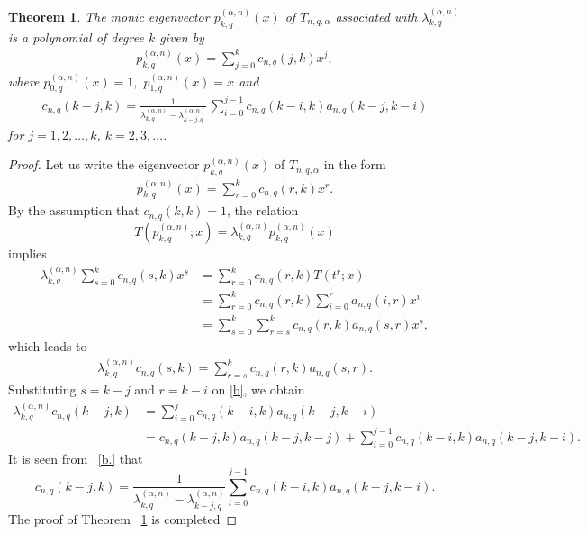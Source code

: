 \documentclass[12pt]{article}
\numberwithin{equation}{section} \theoremstyle{plain}
\newtheorem{theorem}{Theorem}[section]
\theoremstyle{definition}
\theoremstyle{remark}
\begin{document}
\begin{theorem}\label{thmeigq}
The monic eigenvector $p_{k,q}^{(\alpha,n)}(x)$ of $T_{n,q,\alpha}$ associated with
$\lambda_{k,q}^{(\alpha,n)}$ is a polynomial of degree $k$ given by
\begin{align*}
p_{k,q}^{(\alpha,n)}(x) = \sum_{j=0}^k c_{n,q}(j, k) x^j,
\end{align*}
where $p_{0,q}^{(\alpha,n)}(x)=1,$ $p_{1,q}^{(\alpha,n)}(x)=x$ and
\begin{align*}
c_{n,q}(k-j, k) =
\frac{1}{\lambda_{k,q}^{(\alpha,n)}-\lambda_{k-j,q}^{(\alpha,n)}}\,\sum_{i=0}^{j-1} c_{n,q}(k-i, k) a_{n,q}(k-j,k-i) 
\end{align*}
for $j=1,2,\ldots, k$, $k=2,3,\ldots$. 
\end{theorem}

\begin{proof} Let us write the eigenvector $p_{k,q}^{(\alpha,n)}(x)$ of $T_{n,q,\alpha}$ in the form
\begin{align*}
p_{k,q}^{(\alpha,n)}(x) = \sum_{r=0}^k c_{n,q}(r, k) x^r.
\end{align*} 
By the assumption that $c_{n,q}(k,k)=1$, the relation 
$$
T(p_{k,q}^{(\alpha,n)}; x)=\lambda_{k,q}^{(\alpha,n)}p_{k,q}^{(\alpha,n)}(x)
$$ 
implies
\begin{align*}
\lambda_{k,q}^{(\alpha,n)} \sum_{s=0}^k c_{n,q}(s, k) x^s&= \sum_{r=0}^k c_{n,q}(r, k) T(t^r; x) \\
&= \sum_{r=0}^k c_{n,q}(r, k) \sum_{i=0}^{r} a_{n,q}(i, r)x^i\\ 
&= \sum_{s=0}^k \sum_{r=s}^{k} c_{n,q}(r, k) a_{n,q}(s, r)x^s,
\end{align*}
which leads to
\begin{align}\label{b}
\lambda_{k,q}^{(\alpha,n)}c_{n,q}(s, k) =\sum_{r=s}^{k} c_{n,q}(r, k) a_{n,q}(s, r).
\end{align}
Substituting $s=k-j$ and $r=k-i$ on \eqref{b}, we obtain
\begin{align}\label{b.}
\lambda_{k,q}^{(\alpha,n)}c_{n,q}(k-j, k)&=\sum_{i=0}^{j} c_{n,q}(k-i, k) a_{n,q}(k-j, k-i)\nonumber\\
&=c_{n,q}(k-j, k) a_{n,q}(k-j, k-j)+\sum_{i=0}^{j-1} c_{n,q}(k-i, k) a_{n,q}(k-j, k-i).
\end{align}
It is seen from ~\eqref{b.} that
$$
c_{n,q}(k-j, k) = \frac{1}{\lambda_{k,q}^{(\alpha,n)}-\lambda_{k-j,q}^{(\alpha,n)}}
\sum_{i=0}^{j-1} c_{n,q}(k-i, k) a_{n,q}(k-j, k-i).
$$
The proof of Theorem ~\ref{thmeigq} is completed
\end{proof}
\end{document}
